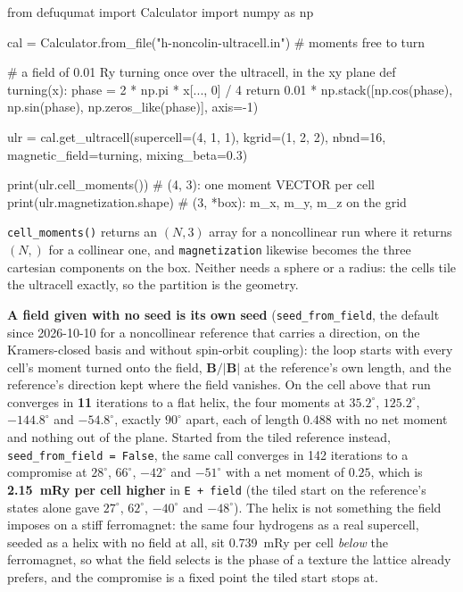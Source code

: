 \documentclass[11pt,a4paper]{article}
\newcommand{\code}[1]{\texttt{\small #1}}
\begin{document}
\begin{pycode}
from defuqumat import Calculator
import numpy as np

cal = Calculator.from_file("h-noncolin-ultracell.in")  # moments free to turn

# a field of 0.01 Ry turning once over the ultracell, in the xy plane
def turning(x):
    phase = 2 * np.pi * x[..., 0] / 4
    return 0.01 * np.stack([np.cos(phase), np.sin(phase),
                            np.zeros_like(phase)], axis=-1)

ulr = cal.get_ultracell(supercell=(4, 1, 1), kgrid=(1, 2, 2), nbnd=16,
                        magnetic_field=turning, mixing_beta=0.3)

print(ulr.cell_moments())         # (4, 3): one moment VECTOR per cell
print(ulr.magnetization.shape)    # (3, *box): m_x, m_y, m_z on the grid
\end{pycode}

\code{cell\_moments()} returns an $(N,3)$ array for a noncollinear run where it
returns $(N,)$ for a collinear one, and \code{magnetization} likewise becomes the
three cartesian components on the box. Neither needs a sphere or a radius: the
cells tile the ultracell exactly, so the partition is the geometry.

\textbf{A field given with no seed is its own seed} (\code{seed\_from\_field},
the default since 2026-10-10 for a noncollinear reference that carries a
direction, on the Kramers-closed basis and without spin-orbit coupling): the loop starts with every cell's
moment turned onto the field, $\mathbf B/|\mathbf B|$ at the reference's own
length, and the reference's direction kept where the field vanishes. On the cell
above that run converges in \textbf{11} iterations to a flat helix, the four
moments at $35.2^\circ$, $125.2^\circ$, $-144.8^\circ$ and $-54.8^\circ$, exactly
$90^\circ$ apart, each of length $0.488$ with no net moment and nothing out of
the plane. Started from the tiled reference instead, \code{seed\_from\_field =
False}, the same call converges in 142 iterations to a compromise at $28^\circ$,
$66^\circ$, $-42^\circ$ and $-51^\circ$ with a net moment of $0.25$, which is
\textbf{2.15~mRy per cell higher} in \code{E + field} (the tiled start on the
reference's states alone gave $27^\circ$, $62^\circ$, $-40^\circ$ and $-48^\circ$).
The helix is not something the field imposes on a stiff ferromagnet: the same
four hydrogens as a real supercell, seeded as a helix with no field at all, sit
0.739~mRy per cell \emph{below} the ferromagnet, so what the field selects is the
phase of a texture the lattice already prefers, and the compromise is a fixed
point the tiled start stops at.
\end{document}
